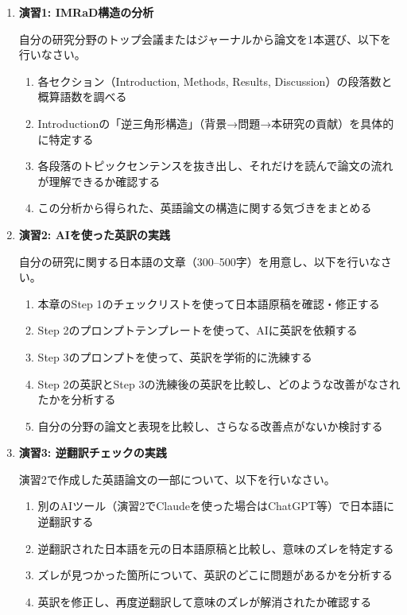 \begin{enumerate}

\item \textbf{演習1: IMRaD構造の分析}

自分の研究分野のトップ会議またはジャーナルから論文を1本選び、以下を行いなさい。
\begin{enumerate}
\item 各セクション（Introduction, Methods, Results, Discussion）の段落数と概算語数を調べる
\item Introductionの「逆三角形構造」（背景→問題→本研究の貢献）を具体的に特定する
\item 各段落のトピックセンテンスを抜き出し、それだけを読んで論文の流れが理解できるか確認する
\item この分析から得られた、英語論文の構造に関する気づきをまとめる
\end{enumerate}

\item \textbf{演習2: AIを使った英訳の実践}

自分の研究に関する日本語の文章（300--500字）を用意し、以下を行いなさい。
\begin{enumerate}
\item 本章のStep 1のチェックリストを使って日本語原稿を確認・修正する
\item Step 2のプロンプトテンプレートを使って、AIに英訳を依頼する
\item Step 3のプロンプトを使って、英訳を学術的に洗練する
\item Step 2の英訳とStep 3の洗練後の英訳を比較し、どのような改善がなされたかを分析する
\item 自分の分野の論文と表現を比較し、さらなる改善点がないか検討する
\end{enumerate}

\item \textbf{演習3: 逆翻訳チェックの実践}

演習2で作成した英語論文の一部について、以下を行いなさい。
\begin{enumerate}
\item 別のAIツール（演習2でClaudeを使った場合はChatGPT等）で日本語に逆翻訳する
\item 逆翻訳された日本語を元の日本語原稿と比較し、意味のズレを特定する
\item ズレが見つかった箇所について、英訳のどこに問題があるかを分析する
\item 英訳を修正し、再度逆翻訳して意味のズレが解消されたか確認する
\end{enumerate}


\end{enumerate}
